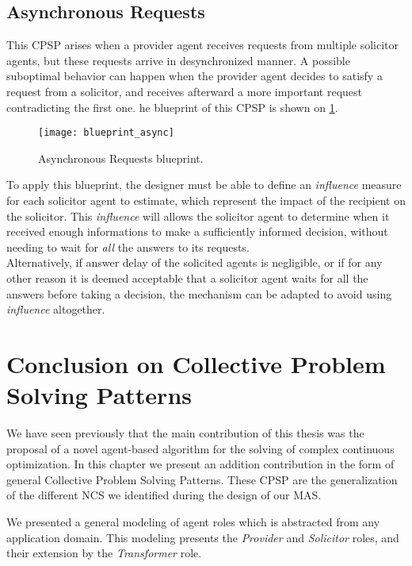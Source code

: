 \subsection{Asynchronous Requests}

This CPSP arises when a provider agent receives requests from multiple solicitor agents, but these requests arrive in desynchronized manner. A possible suboptimal behavior can happen when the provider agent decides to satisfy a request from a solicitor, and receives afterward a more important request contradicting the first one. he blueprint of this CPSP is shown on \figurename{} \ref{blueprint_async}.

\begin{figure}
\centering
\texttt{[image: blueprint\_async]}
\caption{Asynchronous Requests blueprint.}\label{blueprint_async}
\end{figure}

To apply this blueprint, the designer must be able to define an \emph{influence} measure for each solicitor agent to estimate, which represent the impact of the recipient on the solicitor. This \emph{influence} will allows the solicitor agent to determine when it received enough informations to make a sufficiently informed decision, without needing to wait for \emph{all} the answers to its requests.\\
Alternatively, if answer delay of the solicited agents is negligible, or if for any other reason it is deemed acceptable that a solicitor agent waits for all the answers before taking a decision, the mechanism can be adapted to avoid using \emph{influence} altogether.

\section{Conclusion on Collective Problem Solving Patterns}

We have seen previously that the main contribution of this thesis was the proposal of a novel agent-based algorithm for the solving of complex continuous optimization. In this chapter we present an addition contribution in the form of general Collective Problem Solving Patterns. These CPSP are the generalization of the different NCS we identified during the design of our MAS.

We presented a general modeling of agent roles which is abstracted from any application domain. This modeling presents the \emph{Provider} and \emph{Solicitor} roles, and their extension by the \emph{Transformer} role.

